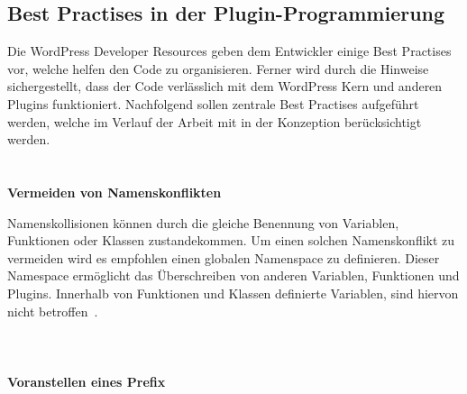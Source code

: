 \subsection{Best Practises in der Plugin-Programmierung}
Die WordPress Developer Resources geben dem Entwickler einige Best Practises vor, welche helfen den Code zu organisieren.
Ferner wird durch die Hinweise sichergestellt, dass der Code verlässlich mit dem WordPress Kern und anderen Plugins funktioniert.
Nachfolgend sollen zentrale Best Practises aufgeführt werden, welche im Verlauf der Arbeit mit in der Konzeption berücksichtigt werden.
\\
\\\\
\textbf{Vermeiden von Namenskonflikten}

Namenskollisionen können durch die gleiche Benennung von Variablen, Funktionen oder Klassen zustandekommen.
Um einen solchen Namenskonflikt zu vermeiden wird es empfohlen einen globalen Namenspace zu definieren.
Dieser Namespace ermöglicht das Überschreiben von anderen Variablen, Funktionen und Plugins.
Innerhalb von Funktionen und Klassen definierte Variablen, sind hiervon nicht betroffen~\cite{wordpress2024Naming}.
\\
\\
\\\\
\textbf{Voranstellen eines Prefix}

